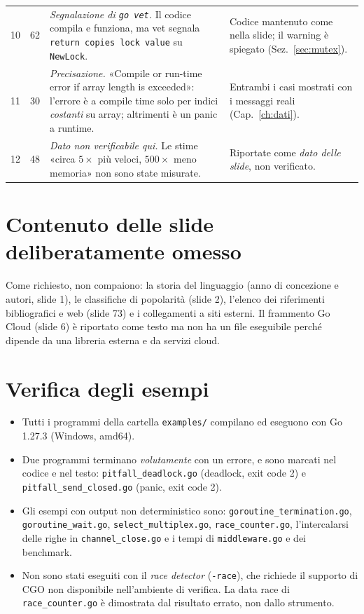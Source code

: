 \documentclass[11pt,a4paper]{report}
\newcommand{\cod}[1]{\texttt{#1}}
\begin{document}
\begin{center}
\begin{longtable}{@{}L{0.5cm}L{1.2cm}L{5.5cm}L{6.4cm}@{}}
10 & 62 & \emph{Segnalazione di \cod{go vet}.} Il codice compila e funziona, ma vet segnala \texttt{return copies lock value} su \cod{NewLock}. &
Codice mantenuto come nella slide; il warning è spiegato (Sez.~\ref{sec:mutex}).\\
11 & 30 & \emph{Precisazione.} «Compile or run-time error if array length is exceeded»: l'errore è a compile time solo per indici \emph{costanti} su array; altrimenti è un panic a runtime. &
Entrambi i casi mostrati con i messaggi reali (Cap.~\ref{ch:dati}).\\
12 & 48 & \emph{Dato non verificabile qui.} Le stime «circa $5\times$ più veloci, $500\times$ meno memoria» non sono state misurate. &
Riportate come \emph{dato delle slide}, non verificato.\\
\bottomrule
\end{longtable}
\end{center}

\section{Contenuto delle slide deliberatamente omesso}

Come richiesto, non compaiono: la storia del linguaggio (anno di concezione e
autori, slide 1), le classifiche di popolarità (slide 2), l'elenco dei
riferimenti bibliografici e web (slide 73) e i collegamenti a siti esterni. Il
frammento Go Cloud (slide 6) è riportato come testo ma non ha un file
eseguibile perché dipende da una libreria esterna e da servizi cloud.

\section{Verifica degli esempi}

\begin{itemize}
  \item Tutti i programmi della cartella \texttt{examples/} compilano ed
        eseguono con Go 1.27.3 (Windows, amd64).
  \item Due programmi terminano \emph{volutamente} con un errore, e sono
        marcati nel codice e nel testo: \texttt{pitfall\_deadlock.go} (deadlock,
        exit code 2) e \texttt{pitfall\_send\_closed.go} (panic, exit code 2).
  \item Gli esempi con output non deterministico sono:
        \texttt{goroutine\_termination.go}, \texttt{goroutine\_wait.go},
        \texttt{select\_multiplex.go}, \texttt{race\_counter.go},
        l'intercalarsi delle righe in \texttt{channel\_close.go} e i tempi di
        \texttt{middleware.go} e dei benchmark.
  \item Non sono stati eseguiti con il \emph{race detector} (\cod{-race}), che
        richiede il supporto di CGO non disponibile nell'ambiente di verifica.
        La data race di \texttt{race\_counter.go} è dimostrata dal risultato
        errato, non dallo strumento.
\end{itemize}
\end{document}
